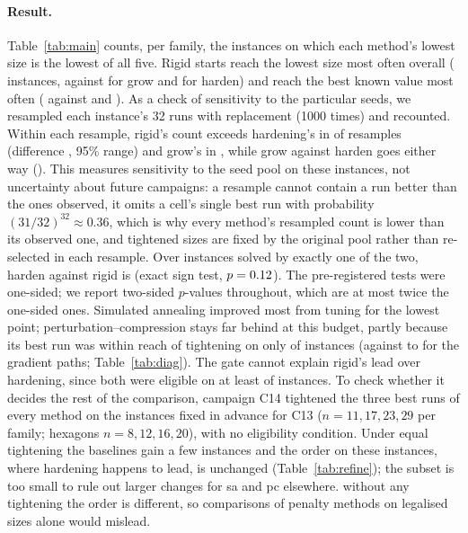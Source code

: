 \paragraph{Result.} Table~\ref{tab:main} counts, per family, the instances on which each method's lowest size is the lowest of all five. Rigid starts reach the lowest size most often overall (\CsevenRigidLowest{} instances, against \CsevenGrowLowest{} for grow and \CsevenHardenLowest{} for harden) and reach the best known value most often (\CsevenRigidSolved{} against \CsevenGrowSolved{} and \CsevenHardenSolved{}). As a check of sensitivity to the particular seeds, we resampled each instance's 32 runs with replacement (1000 times) and recounted. Within each resample, rigid's count exceeds hardening's in \BootDRHPos{} of resamples (difference \BootDRH, 95\% range) and grow's in \BootDRGPos{}, while grow against harden goes either way (\BootDGH). This measures sensitivity to the seed pool on these instances, not uncertainty about future campaigns: a resample cannot contain a run better than the ones observed, it omits a cell's single best run with probability $(31/32)^{32}\approx0.36$, which is why every method's resampled count is lower than its observed one, and tightened sizes are fixed by the original pool rather than re-selected in each resample. Over instances solved by exactly one of the two, harden against rigid is \CsevenSignRigid{} (exact sign test, $p=0.12$). The pre-registered tests were one-sided; we report two-sided $p$-values throughout, which are at most twice the one-sided ones. Simulated annealing improved most from tuning for the lowest point; perturbation--compression stays far behind at this budget, partly because its best run was within reach of tightening on only \EligPc{} of instances (against \EligHarden{} to \EligRigid{} for the gradient paths; Table~\ref{tab:diag}). The gate cannot explain rigid's lead over hardening, since both were eligible on at least \EligHarden{} of instances. To check whether it decides the rest of the comparison, campaign C14 tightened the three best runs of every method on the \RefN{} instances fixed in advance for C13 ($n=11,17,23,29$ per family; hexagons $n=8,12,16,20$), with no eligibility condition. Under equal tightening the baselines gain a few instances and the order on these \RefN{} instances, where hardening happens to lead, is unchanged (Table~\ref{tab:refine}); the subset is too small to rule out larger changes for sa and pc elsewhere. without any tightening the order is different, so comparisons of penalty methods on legalised sizes alone would mislead.

